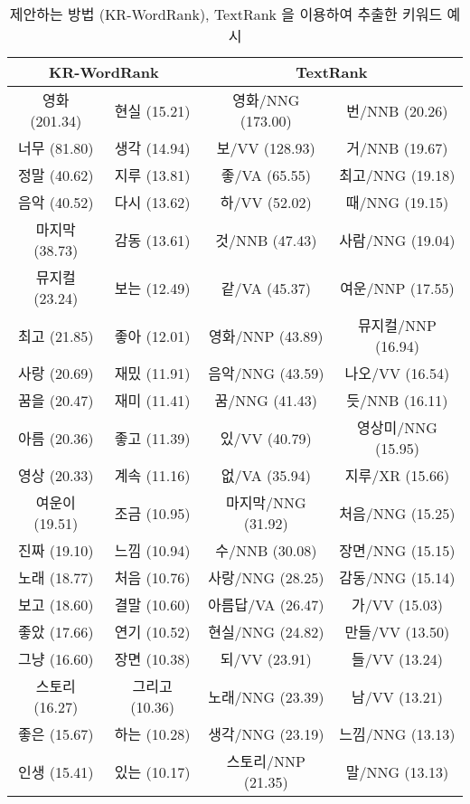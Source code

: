 \documentclass[oneside, ko,phd]{snuthesis_utf8_kor}
\begin{document}
\begin{table}[H]
\centering
\small
\caption{제안하는 방법 (KR-WordRank), TextRank 을 이용하여 추출한 키워드 예시}
\label{tab:krwordrank_keyword_example}
\begin{tabular}{|c|c|c|c|}
\hline
\multicolumn{2}{|c|}{\textbf{KR-WordRank}} & \multicolumn{2}{c|}{\textbf{TextRank}} \\ \hline
영화 (201.34) & 현실 (15.21) & 영화/NNG (173.00) & 번/NNB (20.26) \\ \hline
너무 (81.80) & 생각 (14.94) & 보/VV (128.93) & 거/NNB (19.67) \\ \hline
정말 (40.62) & 지루 (13.81) & 좋/VA (65.55) & 최고/NNG (19.18) \\ \hline
음악 (40.52) & 다시 (13.62) & 하/VV (52.02) & 때/NNG (19.15) \\ \hline
마지막 (38.73) & 감동 (13.61) & 것/NNB (47.43) & 사람/NNG (19.04) \\ \hline
뮤지컬 (23.24) & 보는 (12.49) & 같/VA (45.37) & 여운/NNP (17.55) \\ \hline
최고 (21.85) & 좋아 (12.01) & 영화/NNP (43.89) & 뮤지컬/NNP (16.94) \\ \hline
사랑 (20.69) & 재밌 (11.91) & 음악/NNG (43.59) & 나오/VV (16.54) \\ \hline
꿈을 (20.47) & 재미 (11.41) & 꿈/NNG (41.43) & 듯/NNB (16.11) \\ \hline
아름 (20.36) & 좋고 (11.39) & 있/VV (40.79) & 영상미/NNG (15.95) \\ \hline
영상 (20.33) & 계속 (11.16) & 없/VA (35.94) & 지루/XR (15.66) \\ \hline
여운이 (19.51) & 조금 (10.95) & 마지막/NNG (31.92) & 처음/NNG (15.25) \\ \hline
진짜 (19.10) & 느낌 (10.94) & 수/NNB (30.08) & 장면/NNG (15.15) \\ \hline
노래 (18.77) & 처음 (10.76) & 사랑/NNG (28.25) & 감동/NNG (15.14) \\ \hline
보고 (18.60) & 결말 (10.60) & 아름답/VA (26.47) & 가/VV (15.03) \\ \hline
좋았 (17.66) & 연기 (10.52) & 현실/NNG (24.82) & 만들/VV (13.50) \\ \hline
그냥 (16.60) & 장면 (10.38) & 되/VV (23.91) & 들/VV (13.24) \\ \hline
스토리 (16.27) & 그리고 (10.36) & 노래/NNG (23.39) & 남/VV (13.21) \\ \hline
좋은 (15.67) & 하는 (10.28) & 생각/NNG (23.19) & 느낌/NNG (13.13) \\ \hline
인생 (15.41) & 있는 (10.17) & 스토리/NNP (21.35) & 말/NNG (13.13) \\ \hline
\end{tabular}
\end{table}
\end{document}
